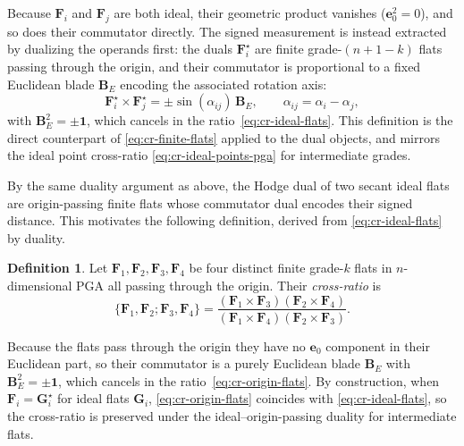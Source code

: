\documentclass{birkjour}
\theoremstyle{definition}
\newtheorem{definition}[theorem]{Definition}
\theoremstyle{remark}
\begin{document}
Because $\mathbf{F}_i$ and $\mathbf{F}_j$ are both ideal, their geometric product vanishes ($\mathbf{e}_0^2 = 0$), and so does their commutator directly. The signed measurement is instead extracted by dualizing the operands first: the duals $\mathbf{F}_i^\star$ are finite grade-$(n+1-k)$ flats passing through the origin, and their commutator is proportional to a fixed Euclidean blade $\mathbf{B}_E$ encoding the associated rotation axis:
\begin{equation}
  \mathbf{F}_i^\star \times \mathbf{F}_j^\star
  = \pm\sin(\alpha_{ij})\,\mathbf{B}_E,
  \qquad \alpha_{ij} = \alpha_i - \alpha_j,
\end{equation}
with $\mathbf{B}_E^2 = \pm\mathbf{1}$, which cancels in the ratio~\eqref{eq:cr-ideal-flats}. This definition is the direct counterpart of \eqref{eq:cr-finite-flats} applied to the dual objects, and mirrors the ideal point cross-ratio \eqref{eq:cr-ideal-points-pga} for intermediate grades.

By the same duality argument as above, the Hodge dual of two secant ideal flats are origin-passing finite flats whose commutator dual encodes their signed distance. This motivates the following definition, derived from \eqref{eq:cr-ideal-flats} by duality.

\begin{definition}
\label{def:cr-origin-flats}
Let $\mathbf{F}_1, \mathbf{F}_2, \mathbf{F}_3, \mathbf{F}_4$ be four distinct finite grade-$k$ flats in $n$-dimensional PGA all passing through the origin. Their \emph{cross-ratio} is
\begin{equation}
  \{\mathbf{F}_1, \mathbf{F}_2; \mathbf{F}_3, \mathbf{F}_4\}
  =
  \frac{(\mathbf{F}_1 \times \mathbf{F}_3)
        (\mathbf{F}_2 \times \mathbf{F}_4)}
       {(\mathbf{F}_1 \times \mathbf{F}_4)
        (\mathbf{F}_2 \times \mathbf{F}_3)}.
  \label{eq:cr-origin-flats}
\end{equation}
\end{definition}

Because the flats pass through the origin they have no $\mathbf{e}_0$ component in their Euclidean part, so their commutator is a purely Euclidean blade $\mathbf{B}_E$ with $\mathbf{B}_E^2 = \pm\mathbf{1}$, which cancels in the ratio~\eqref{eq:cr-origin-flats}. By construction, when $\mathbf{F}_i = \mathbf{G}_i^\star$ for ideal flats $\mathbf{G}_i$, \eqref{eq:cr-origin-flats} coincides with \eqref{eq:cr-ideal-flats}, so the cross-ratio is preserved under the ideal--origin-passing duality for intermediate flats.
\end{document}
